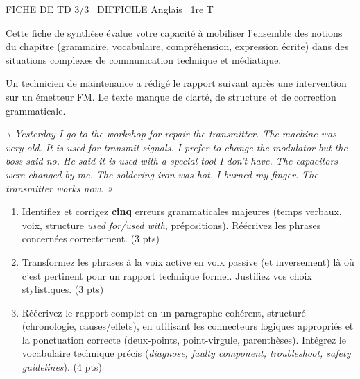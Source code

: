 \documentclass[11pt]{article}
\begin{document}
\begin{tcolorbox}[enhanced,colback=popink,colframe=popink,arc=10pt,boxrule=0pt,left=12pt,right=12pt,top=9pt,bottom=9pt]
{\color{white}\popxbold\small FICHE DE TD 3/3 \textbullet\ DIFFICILE \hfill Anglais \textbullet\ 1re T\par}
\end{tcolorbox}
\vspace{4pt}
Cette fiche de synthèse évalue votre capacité à mobiliser l'ensemble des notions du chapitre (grammaire, vocabulaire, compréhension, expression écrite) dans des situations complexes de communication technique et médiatique.

\begin{exercice}
Un technicien de maintenance a rédigé le rapport suivant après une intervention sur un émetteur FM. Le texte manque de clarté, de structure et de correction grammaticale.

\textit{« Yesterday I go to the workshop for repair the transmitter. The machine was very old. It is used for transmit signals. I prefer to change the modulator but the boss said no. He said it is used with a special tool I don't have. The capacitors were changed by me. The soldering iron was hot. I burned my finger. The transmitter works now. »}

\begin{enumerate}
    \item Identifiez et corrigez \textbf{cinq} erreurs grammaticales majeures (temps verbaux, voix, structure \textit{used for/used with}, prépositions). Réécrivez les phrases concernées correctement. (3 pts)
    \item Transformez les phrases à la voix active en voix passive (et inversement) là où c'est pertinent pour un rapport technique formel. Justifiez vos choix stylistiques. (3 pts)
    \item Réécrivez le rapport complet en un paragraphe cohérent, structuré (chronologie, causes/effets), en utilisant les connecteurs logiques appropriés et la ponctuation correcte (deux-points, point-virgule, parenthèses). Intégrez le vocabulaire technique précis (\textit{diagnose, faulty component, troubleshoot, safety guidelines}). (4 pts)
\end{enumerate}
\end{exercice}
\end{document}
